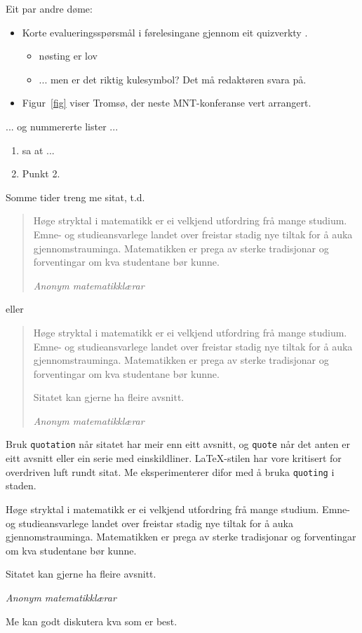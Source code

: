 \documentclass[nynorsk,journal]{mnt}
\begin{document}
Eit par andre døme:
\begin{itemize}
  \item 
Korte evalueringsspørsmål i førelesingane gjennom eit
      quizverkty \citep{hgs2018udit}.
   \begin{itemize}
     \item nøsting er lov
     \item ... men er det riktig kulesymbol?  Det må redaktøren svara på.
   \end{itemize}
  \item 
Figur~\ref{fig} viser Tromsø, der neste MNT-konferanse vert arrangert.
\end{itemize}

... og nummererte lister ...
\begin{enumerate}
  \item 
    \cite{biggs11a} sa at ...
  \item Punkt 2.
\end{enumerate}

Somme tider treng me sitat, t.d.\
\begin{quote}
Høge stryktal i matematikk er ei velkjend utfordring frå mange studium.
Emne- og studieansvarlege landet over freistar 
stadig nye tiltak for å auka gjennomstrauminga.
Matematikken er prega av sterke tradisjonar og forventingar om kva
studentane bør kunne.

\raggedleft\emph{Anonym matematikklærar}
\end{quote}
eller 
\begin{quotation}
Høge stryktal i matematikk er ei velkjend utfordring frå mange studium.
Emne- og studieansvarlege landet over freistar 
stadig nye tiltak for å auka gjennomstrauminga.
Matematikken er prega av sterke tradisjonar og forventingar om kva
studentane bør kunne.

Sitatet kan gjerne ha fleire avsnitt.

\raggedleft\emph{Anonym matematikklærar}
\end{quotation}
Bruk \verb.quotation. når sitatet har meir enn eitt avsnitt, og 
\verb.quote. når det anten er eitt avsnitt eller ein serie med 
einskildliner.
\LaTeX-stilen har vore kritisert for overdriven luft rundt sitat.
Me eksperimenterer difor med å bruka \verb.quoting. i staden.
\begin{quoting}
Høge stryktal i matematikk er ei velkjend utfordring frå mange studium.
Emne- og studieansvarlege landet over freistar 
stadig nye tiltak for å auka gjennomstrauminga.
Matematikken er prega av sterke tradisjonar og forventingar om kva
studentane bør kunne.

Sitatet kan gjerne ha fleire avsnitt.

\raggedleft\emph{Anonym matematikklærar}
\end{quoting}
Me kan godt diskutera kva som er best.



\end{document}
